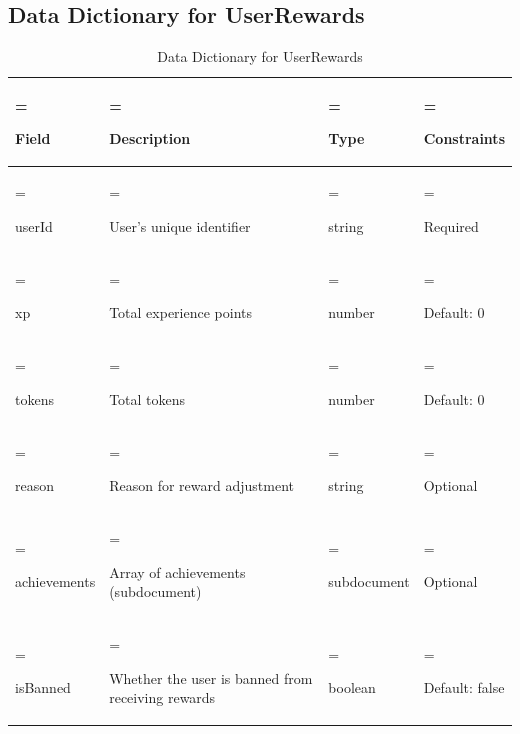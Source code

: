 \subsection{Data Dictionary for UserRewards}
\begin{table}[H]
    \renewcommand{\arraystretch}{1.5} %
    \centering
    \caption{Data Dictionary for UserRewards}
    \medskip
    \begin{tabularx}{\textwidth} {
            | >{\hsize=0.8\hsize\linewidth=\hsize\raggedright\arraybackslash}X
            | >{\hsize=1.5\hsize\linewidth=\hsize\raggedright\arraybackslash}X
            | >{\hsize=0.6\hsize\linewidth=\hsize\raggedright\arraybackslash}X
            | >{\hsize=1.1\hsize\linewidth=\hsize\raggedright\arraybackslash}X |}
        \hline
        \rowcolor{primary} \textbf{Field} & \textbf{Description} & \textbf{Type} & \textbf{Constraints} \\
        \hline
        userId & User's unique identifier & string & Required \\
        \hline
        xp & Total experience points & number & Default: 0 \\
        \hline
        tokens & Total tokens & number & Default: 0 \\
        \hline
        reason & Reason for reward adjustment & string & Optional \\
        \hline
        achievements & Array of achievements (subdocument) & subdocument & Optional \\
        \hline
        isBanned & Whether the user is banned from receiving rewards & boolean & Default: false \\
        \hline
    \end{tabularx}
\end{table}

